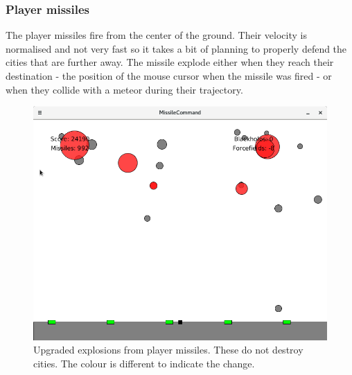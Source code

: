 \documentclass{article}
\begin{document}
\subsubsection*{Player missiles}
The player missiles fire from the center of the ground. Their velocity is normalised and not very fast so it takes a bit of planning to properly defend the cities that are further away. The missile explode either when they reach their destination - the position of the mouse cursor when the missile was fired - or when they collide with a meteor during their trajectory. 
\begin{figure}[H]
\centering
\includegraphics[width=1\textwidth, keepaspectratio]{imgs/UpgradedExplosion.png}
\caption{Upgraded explosions from player missiles. These do not destroy cities. The colour is different to indicate the change.}
\end{figure}
\end{document}
